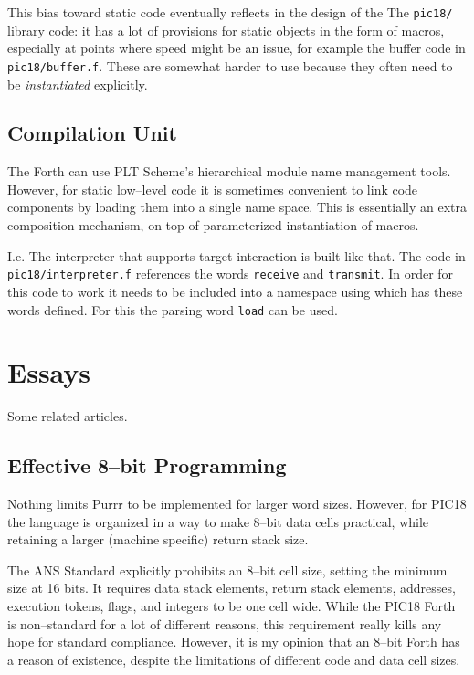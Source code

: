 \documentclass[12pt]{article}
\begin{document}
This bias toward static code eventually reflects in the design of the
The \verb|pic18/| library code: it has a lot of provisions for static
objects in the form of macros, especially at points where speed might
be an issue, for example the buffer code in \verb|pic18/buffer.f|.
These are somewhat harder to use because they often need to be
\emph{instantiated} explicitly.

\subsection{Compilation Unit}

The Forth can use PLT Scheme's hierarchical module name management
tools. However, for static low--level code it is sometimes convenient
to link code components by loading them into a single name space.
This is essentially an extra composition mechanism, on top of
parameterized instantiation of macros. 

I.e. The interpreter that supports target interaction is built like
that.  The code in \verb|pic18/interpreter.f| references the words
\verb|receive| and \verb|transmit|. In order for this code to work it
needs to be included into a namespace using which has these words
defined. For this the parsing word \verb|load| can be used.



\section{Essays}

Some related articles.

\subsection{Effective 8--bit Programming}

Nothing limits Purrr to be implemented for larger word sizes. However,
for PIC18 the language is organized in a way to make 8--bit data cells
practical, while retaining a larger (machine specific) return stack
size.

The ANS Standard explicitly prohibits an 8--bit cell size, setting the
minimum size at 16 bits. It requires data stack elements, return stack
elements, addresses, execution tokens, flags, and integers to be one
cell wide. While the PIC18 Forth is non--standard for a lot of
different reasons, this requirement really kills any hope for standard
compliance. However, it is my opinion that an 8--bit Forth has a
reason of existence, despite the limitations of different code and
data cell sizes.
\end{document}
